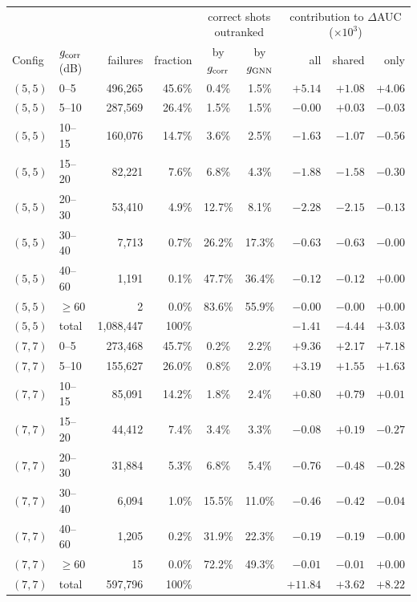 \begin{tabular}{ll|rr|cc|rrr}
\toprule
 & & & & \multicolumn{2}{c|}{correct shots outranked} & \multicolumn{3}{c}{contribution to $\Delta$AUC ($\times 10^{3}$)} \\
Config & $g_{\rm corr}$ (dB) & failures & fraction & by $g_{\rm corr}$ & by $g_{\rm GNN}$ & all & shared & only \\
\hline
\midrule
$(5, 5)$ & 0--5 & 496,265 & 45.6\% & 0.4\% & 1.5\% & $+5.14$ & $+1.08$ & $+4.06$ \\
$(5, 5)$ & 5--10 & 287,569 & 26.4\% & 1.5\% & 1.5\% & $-0.00$ & $+0.03$ & $-0.03$ \\
$(5, 5)$ & 10--15 & 160,076 & 14.7\% & 3.6\% & 2.5\% & $-1.63$ & $-1.07$ & $-0.56$ \\
$(5, 5)$ & 15--20 & 82,221 & 7.6\% & 6.8\% & 4.3\% & $-1.88$ & $-1.58$ & $-0.30$ \\
$(5, 5)$ & 20--30 & 53,410 & 4.9\% & 12.7\% & 8.1\% & $-2.28$ & $-2.15$ & $-0.13$ \\
$(5, 5)$ & 30--40 & 7,713 & 0.7\% & 26.2\% & 17.3\% & $-0.63$ & $-0.63$ & $-0.00$ \\
$(5, 5)$ & 40--60 & 1,191 & 0.1\% & 47.7\% & 36.4\% & $-0.12$ & $-0.12$ & $+0.00$ \\
$(5, 5)$ & $\geq 60$ & 2 & 0.0\% & 83.6\% & 55.9\% & $-0.00$ & $-0.00$ & $+0.00$ \\
$(5, 5)$ & total & 1,088,447 & 100\% & & & $-1.41$ & $-4.44$ & $+3.03$ \\
\hline
$(7, 7)$ & 0--5 & 273,468 & 45.7\% & 0.2\% & 2.2\% & $+9.36$ & $+2.17$ & $+7.18$ \\
$(7, 7)$ & 5--10 & 155,627 & 26.0\% & 0.8\% & 2.0\% & $+3.19$ & $+1.55$ & $+1.63$ \\
$(7, 7)$ & 10--15 & 85,091 & 14.2\% & 1.8\% & 2.4\% & $+0.80$ & $+0.79$ & $+0.01$ \\
$(7, 7)$ & 15--20 & 44,412 & 7.4\% & 3.4\% & 3.3\% & $-0.08$ & $+0.19$ & $-0.27$ \\
$(7, 7)$ & 20--30 & 31,884 & 5.3\% & 6.8\% & 5.4\% & $-0.76$ & $-0.48$ & $-0.28$ \\
$(7, 7)$ & 30--40 & 6,094 & 1.0\% & 15.5\% & 11.0\% & $-0.46$ & $-0.42$ & $-0.04$ \\
$(7, 7)$ & 40--60 & 1,205 & 0.2\% & 31.9\% & 22.3\% & $-0.19$ & $-0.19$ & $-0.00$ \\
$(7, 7)$ & $\geq 60$ & 15 & 0.0\% & 72.2\% & 49.3\% & $-0.01$ & $-0.01$ & $+0.00$ \\
$(7, 7)$ & total & 597,796 & 100\% & & & $+11.84$ & $+3.62$ & $+8.22$ \\

\end{tabular}
